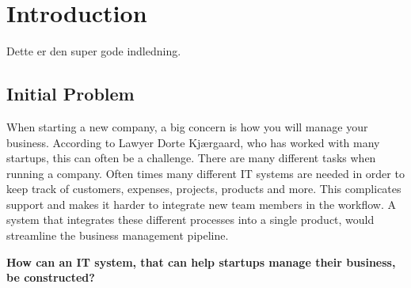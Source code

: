 \chapter{Introduction}\label{ch:Indledning}
Dette er den super gode indledning.\cite{website:Eksempel}

\section{Initial Problem}
When starting a new company, a big concern is how you will manage your business. 
According to Lawyer Dorte Kjærgaard, who has worked with many startups, this can often be a challenge. There are many different tasks when running a company. Often times many different IT systems are needed in order to keep track of customers, expenses, projects, products and more. This complicates support and makes it harder to integrate new team members in the workflow.
A system that integrates these different processes into a single product, would streamline the business management pipeline. 

\textbf{How can an IT system, that can help startups manage their business, be constructed?}